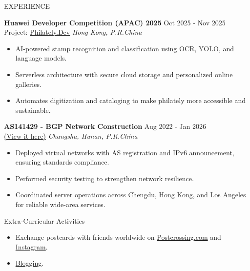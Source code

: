 \documentclass{resume} %
\begin{document}
\newpage
\begin{rSection}{EXPERIENCE}

\textbf{Huawei Developer Competition (APAC) 2025} \hfill Oct 2025 - Nov 2025\\
Project: \href{https://philately.dev/}{Philately.Dev} \hfill \textit{Hong Kong, P.R.China}
 \begin{itemize}
    \itemsep -3pt {} 
     \item AI-powered stamp recognition and classification using OCR, YOLO, and language models.
     \item Serverless architecture with secure cloud storage and personalized online galleries.
    \item Automates digitization and cataloging to make philately more accessible and sustainable.
 \end{itemize}

\vspace{0.3cm}
\textbf{AS141429 - BGP Network Construction } \hfill Aug 2022 - Jan 2026\\
\href{https://www.peeringdb.com/net/38176}{(View it here)} \hfill \textit{Changsha, Hunan, P.R.China}
 \begin{itemize}
    \itemsep -3pt {} 
     \item Deployed virtual networks with AS registration and IPv6 announcement, ensuring standards compliance.
     \item Performed security testing to strengthen network resilience.
    \item Coordinated server operations across Chengdu, Hong Kong, and Los Angeles for reliable wide-area services.
 \end{itemize}

\end{rSection} 

\vspace{0.6cm}
\begin{rSection}{Extra-Curricular Activities} 
\begin{itemize}
    \item 	Exchange postcards with friends worldwide on \href{https://www.postcrossing.com/}{Postcrossing.com} and \href{https://www.instagram.com/mikewu597}{Instagram}. 
    \item 	\href{https://hyp.ink}{Blogging}. 
\end{itemize}


\end{rSection}
\end{document}
